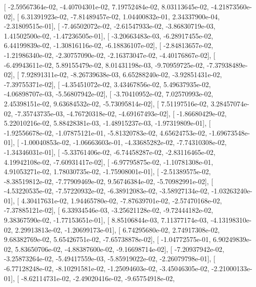 \documentclass{article}
\begin{document}
       [ -2.59567364e-02,  -4.40704301e-02,   7.19752484e-02,
          8.03113645e-02,  -4.21873560e-02],
       [  6.31391923e-02,  -7.81489457e-02,   1.04400832e-01,
          2.34337900e-04,  -2.31809515e-01],
       [ -7.46502072e-02,  -2.61547933e-02,  -3.86830719e-03,
          1.41502500e-02,  -1.47236505e-01],
       [ -3.20663483e-03,  -6.28917455e-02,   6.44199839e-02,
         -1.30816116e-02,  -6.18836107e-02],
       [ -2.84813657e-02,  -1.21986340e-02,  -2.30757090e-02,
         -2.16373047e-02,  -4.40176867e-02],
       [ -6.49943611e-02,   5.89155479e-02,   8.01431198e-03,
         -9.70959725e-02,  -7.37938489e-02],
       [  7.92891311e-02,  -8.26739638e-03,   6.65288240e-02,
         -3.92851431e-02,  -7.39755371e-02],
       [ -4.35451072e-02,   3.43467856e-02,   5.49637935e-02,
         -4.06898707e-03,  -5.56807942e-02],
       [ -3.70410952e-02,   7.02570993e-02,   2.45398151e-02,
          9.63684532e-02,  -5.73095814e-02],
       [  7.51197516e-02,   3.28457074e-02,  -7.35743735e-03,
         -4.76720318e-02,  -4.69167493e-02],
       [ -1.86680429e-02,   5.22010216e-02,   5.88428381e-03,
         -1.48915237e-03,  -1.97319809e-01],
       [ -1.92556678e-02,  -1.07875121e-01,  -5.81320783e-02,
          4.65624753e-02,  -1.69673548e-01],
       [ -1.00040853e-02,  -1.06663603e-01,  -4.33685282e-02,
         -7.74310308e-02,  -1.34346031e-01],
       [ -5.33761406e-02,  -6.74458287e-02,  -2.83116465e-02,
          4.19942108e-02,  -7.60931417e-02],
       [ -6.97795875e-02,  -1.10781308e-01,   4.91053271e-02,
          1.78030735e-02,  -1.75908001e-01],
       [ -2.51389575e-02,  -8.38519812e-02,  -7.77909469e-02,
          9.56746384e-02,  -5.70982991e-02],
       [ -4.53220535e-02,  -7.57220932e-02,  -6.38912083e-02,
         -3.58927134e-02,  -1.03263240e-01],
       [  4.30417631e-02,   1.94465780e-02,  -7.87639701e-02,
         -2.57470168e-02,  -7.37885121e-02],
       [  6.33934546e-03,  -3.25621128e-02,  -9.72444182e-02,
          9.38367590e-02,  -1.77153651e-01],
       [  8.85106844e-03,   7.11377174e-03,  -4.13198310e-02,
          2.29913813e-02,  -1.20699173e-01],
       [  6.74295680e-02,   2.74917308e-02,   9.68382769e-02,
          5.65426751e-02,  -7.65738878e-02],
       [ -1.04772575e-01,   6.90249839e-02,   5.83650706e-02,
         -4.88387600e-02,  -9.16698714e-02],
       [ -7.20937942e-02,  -3.25873264e-02,  -5.49417559e-03,
         -5.85919022e-02,  -2.26079798e-01],
       [ -6.77128248e-02,  -8.10291581e-02,  -1.25094603e-02,
         -3.45046305e-02,  -2.21000133e-01],
       [ -8.62114731e-02,  -2.49020416e-02,  -9.65754918e-02,
\end{document}
